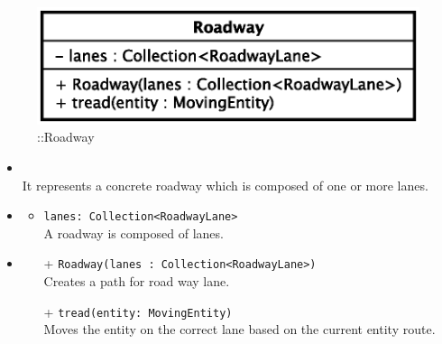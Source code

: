 \begin{figure}[h]
\centering
\includegraphics[scale=0.6,keepaspectratio]{images/solution/roadway.eps}
\caption{\pReactiveComponent::Roadway}
\label{fig:sd-app-roadway}
\end{figure}
\FloatBarrier
\begin{itemize}
  \item \textbf{\descr} \\
    It represents a concrete roadway which is composed of one or more lanes.
  \item \textbf{\attrs}
  \begin{itemize}
    \item \texttt{lanes: Collection<RoadwayLane>} \\
A roadway is composed of lanes.
  \end{itemize}
  \item \textbf{\ops}
  \begin{itemize}
  \item[+] \texttt{Roadway(lanes : Collection<RoadwayLane>)} \\
    Creates a path for road way lane.
    \item[+] \texttt{tread(entity: MovingEntity)} \\
Moves the entity on the correct lane based on the current entity route. 
  \end{itemize}
\end{itemize}

